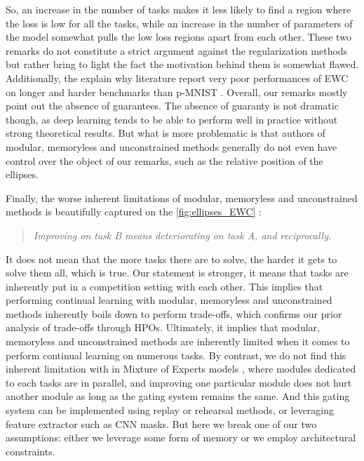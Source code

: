 \documentclass[11pt]{article}
\begin{document}
\vspace{2mm}
\noindent
So, an increase in the number of tasks makes it less likely to find a region where the loss is low for all the tasks, while an increase in the number of parameters of the model somewhat pulls the low loss regions apart from each other. These two remarks do not constitute a strict argument against the regularization methods but rather bring to light the fact the motivation behind them is somewhat flawed. Additionally, the explain why literature report very poor performances of EWC on longer and harder benchmarks than p-MNIST \cite{EWC_4_ref_romain}\cite{EWC_6_Adversarial_CL}. Overall, our remarks mostly point out the absence of guarantees. The absence of guaranty is not dramatic though, as deep learning tends to be able to perform well in practice without strong theoretical results. But what is more problematic is that authors of modular, memoryless and unconstrained methods generally do not even have control over the object of our remarks, such as the relative position of the ellipses.

\vspace{2mm}
\noindent
Finally, the worse inherent limitations of modular, memoryless and unconstrained methods is beautifully captured on the \ref{fig:ellipses_EWC} :
\begin{quote}
    \itshape
    \centering
    Improving on task B means deteriorating on task A, and reciprocally.
\end{quote}
\vspace{2mm}
\noindent
It does not mean that the more tasks there are to solve, the harder it gets to solve them all, which is true. Our statement is stronger, it means that tasks are inherently put in a competition setting with each other. This implies that performing continual learning with modular, memoryless and unconstrained methods inherently boils down to perform trade-offs, which confirms our prior analysis of trade-offs through HPOs. Ultimately, it implies that modular, memoryless and unconstrained methods are inherently limited when it comes to perform continual learning on numerous tasks. By contrast, we do not find this inherent limitation with in Mixture of Experts models \cite{moe_1}\cite{moe_2}, where modules dedicated to each tasks are in parallel, and improving one particular module does not hurt another module as long as the gating system remains the same. And this gating system can be implemented using replay or rehearsal methods, or leveraging feature extractor such as CNN masks. But here we break one of our two assumptions: either we leverage some form of memory or we employ architectural constraints.
\end{document}
